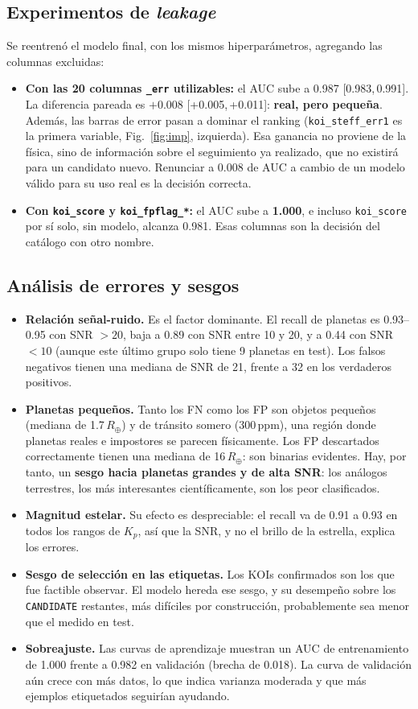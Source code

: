 \documentclass[11pt,a4paper]{article}
\newcommand{\ci}[2]{{\footnotesize[#1,\,#2]}}
\begin{document}
\subsection{Experimentos de \textit{leakage}}
Se reentrenó el modelo final, con los mismos hiperparámetros, agregando las columnas excluidas:
\begin{itemize}
\item \textbf{Con las 20 columnas \texttt{\_err} utilizables:} el AUC sube a 0.987 \ci{0.983}{0.991}. La diferencia pareada es $+0.008$ \ci{+0.005}{+0.011}: \textbf{real, pero pequeña}. Además, las barras de error pasan a dominar el ranking (\texttt{koi\_steff\_err1} es la primera variable, Fig.~\ref{fig:imp}, izquierda). Esa ganancia no proviene de la física, sino de información sobre el seguimiento ya realizado, que no existirá para un candidato nuevo. Renunciar a 0.008 de AUC a cambio de un modelo válido para su uso real es la decisión correcta.
\item \textbf{Con \texttt{koi\_score} y \texttt{koi\_fpflag\_*}:} el AUC sube a \textbf{1.000}, e incluso \texttt{koi\_score} por sí solo, sin modelo, alcanza 0.981. Esas columnas son la decisión del catálogo con otro nombre.
\end{itemize}

\subsection{Análisis de errores y sesgos}
\begin{itemize}
\item \textbf{Relación señal-ruido.} Es el factor dominante. El recall de planetas es 0.93--0.95 con SNR $>20$, baja a 0.89 con SNR entre 10 y 20, y a 0.44 con SNR $<10$ (aunque este último grupo solo tiene 9 planetas en test). Los falsos negativos tienen una mediana de SNR de 21, frente a 32 en los verdaderos positivos.
\item \textbf{Planetas pequeños.} Tanto los FN como los FP son objetos pequeños (mediana de 1.7\,$R_\oplus$) y de tránsito somero (300\,ppm), una región donde planetas reales e impostores se parecen físicamente. Los FP descartados correctamente tienen una mediana de 16\,$R_\oplus$: son binarias evidentes. Hay, por tanto, un \textbf{sesgo hacia planetas grandes y de alta SNR}: los análogos terrestres, los más interesantes científicamente, son los peor clasificados.
\item \textbf{Magnitud estelar.} Su efecto es despreciable: el recall va de 0.91 a 0.93 en todos los rangos de $K_p$, así que la SNR, y no el brillo de la estrella, explica los errores.
\item \textbf{Sesgo de selección en las etiquetas.} Los KOIs confirmados son los que fue factible observar. El modelo hereda ese sesgo, y su desempeño sobre los \texttt{CANDIDATE} restantes, más difíciles por construcción, probablemente sea menor que el medido en test.
\item \textbf{Sobreajuste.} Las curvas de aprendizaje muestran un AUC de entrenamiento de 1.000 frente a 0.982 en validación (brecha de 0.018). La curva de validación aún crece con más datos, lo que indica varianza moderada y que más ejemplos etiquetados seguirían ayudando.
\end{itemize}
\end{document}
